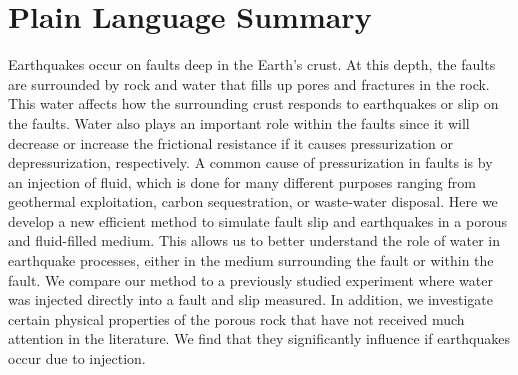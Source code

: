 \documentclass[draft]{agujournal2019}
\begin{document}
\section*{Plain Language Summary}
Earthquakes occur on faults deep in the Earth's crust. At this depth, the faults are surrounded by rock and water that fills up pores and fractures in the rock. This water affects how the surrounding crust responds to earthquakes or slip on the faults. Water also plays an important role within the faults since it will decrease or increase the frictional resistance if it causes pressurization or depressurization, respectively. A common cause of pressurization in faults is by an injection of fluid, which is done for many different purposes ranging from geothermal exploitation, carbon sequestration, or waste-water disposal. Here we develop a new efficient method to simulate fault slip and earthquakes in a porous and fluid-filled medium. This allows us to better understand the role of water in earthquake processes, either in the medium surrounding the fault or within the fault. We compare our method to a previously studied experiment where water was injected directly into a fault and slip measured. In addition, we investigate certain physical properties of the porous rock that have not received much attention in the literature. We find that they significantly influence if earthquakes occur due to injection.


%
%

% 
%


%
%
%
%
\end{document}
